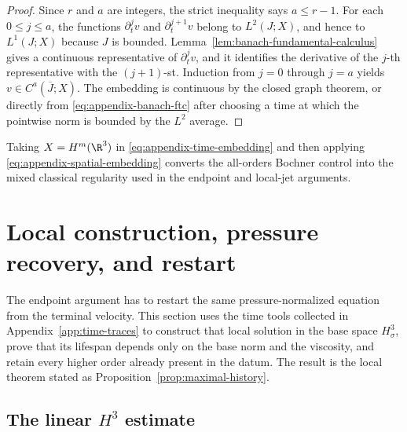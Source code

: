 \begin{proof}
Since \(r\) and \(a\) are integers, the strict inequality says \(a\le r-1\).
For each \(0\le j\le a\), the functions \(\partial_t^jv\) and \(\partial_t^{j+1}v\) belong to \(L^2(J;X)\), and hence to \(L^1(J;X)\) because \(J\) is bounded.
Lemma~\ref{lem:banach-fundamental-calculus} gives a continuous representative of \(\partial_t^jv\), and it identifies the derivative of the \(j\)-th representative with the \((j+1)\)-st.
Induction from \(j=0\) through \(j=a\) yields \(v\in C^a(\overline J;X)\).
The embedding is continuous by the closed graph theorem, or directly from \eqref{eq:appendix-banach-ftc} after choosing a time at which the pointwise norm is bounded by the \(L^2\) average.
\end{proof}

Taking \(X=H^m(\R^3)\) in \eqref{eq:appendix-time-embedding} and then applying \eqref{eq:appendix-spatial-embedding} converts the all-orders Bochner control into the mixed classical regularity used in the endpoint and local-jet arguments.

\section{Local construction, pressure recovery, and restart}
\label{app:local-theory}

The endpoint argument has to restart the same pressure-normalized equation from the terminal velocity.
This section uses the time tools collected in Appendix~\ref{app:time-traces} to construct that local solution in the base space \(H^3_\sigma\), prove that its lifespan depends only on the base norm and the viscosity, and retain every higher order already present in the datum.
The result is the local theorem stated as Proposition~\ref{prop:maximal-history}.

\subsection{\texorpdfstring{The linear \(H^3\) estimate}{The linear H3 estimate}}

